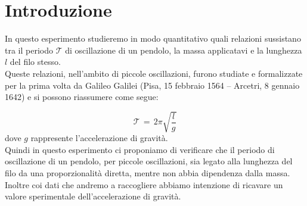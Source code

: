 \section{Introduzione}


In questo esperimento studieremo in modo quantitativo quali relazioni sussistano tra il periodo $\mathcal{T}$ di oscillazione di un pendolo, la massa applicatavi e la lunghezza $l$ del filo stesso.\\
Queste relazioni, nell'ambito di piccole oscillazioni, furono studiate e formalizzate per la prima volta da Galileo Galilei (Pisa, 15 febbraio 1564 – Arcetri, 8 gennaio 1642) e si possono riassumere come segue:

\begin{equation}
	\mathcal{T} \,=\, 2\pi\sqrt{\frac{l}{g}} 
\end{equation}
%
dove $g$ rappresente l'accelerazione di gravità.\\
Quindi in questo esperimento ci proponiamo di verificare che il periodo di oscillazione di un pendolo, per piccole oscillazioni, sia legato alla lunghezza del filo da una proporzionalità diretta, mentre non abbia dipendenza dalla massa.
Inoltre coi dati che andremo a raccogliere abbiamo intenzione di ricavare un valore sperimentale dell'accelerazione di gravità.